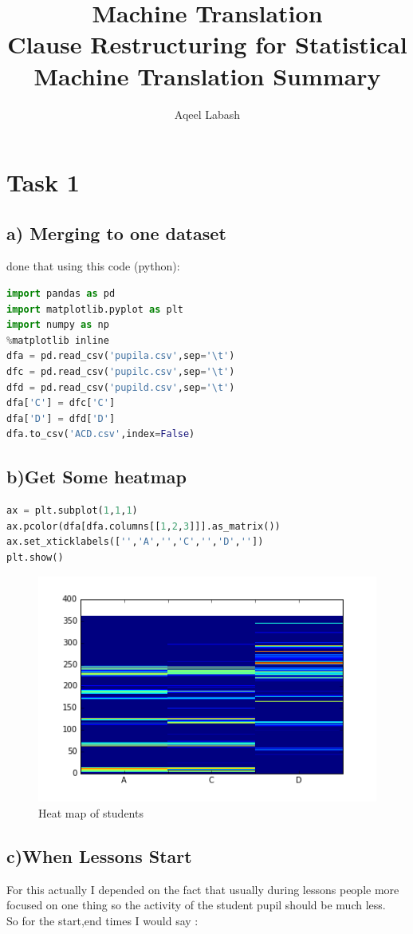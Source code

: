 \documentclass[10pt]{article}
\date{\vspace{-11.5ex}}
\author{\vspace{-10ex}}
\author{\large{Aqeel Labash}\vspace{4ex}}
\title{\vspace{-15ex}\huge{Machine Translation}\\\LARGE{Clause Restructuring for Statistical Machine Translation Summary}\vspace{-2ex}}
\begin{document}
\maketitle
\section*{Task 1}
\subsection*{a) Merging to one dataset}
done that using this code (python): 
\begin{lstlisting}[language=python]
import pandas as pd
import matplotlib.pyplot as plt
import numpy as np
%matplotlib inline
dfa = pd.read_csv('pupila.csv',sep='\t')
dfc = pd.read_csv('pupilc.csv',sep='\t')
dfd = pd.read_csv('pupild.csv',sep='\t')
dfa['C'] = dfc['C']
dfa['D'] = dfd['D']
dfa.to_csv('ACD.csv',index=False)
\end{lstlisting}
\subsection*{b)Get Some heatmap}
\begin{lstlisting}[language=python]
ax = plt.subplot(1,1,1)
ax.pcolor(dfa[dfa.columns[[1,2,3]]].as_matrix())
ax.set_xticklabels(['','A','','C','','D',''])
plt.show()
\end{lstlisting}
\begin{figure}[H]
\includegraphics[scale=1]{heatmap.png}
\caption{Heat map of students}
\end{figure}
\subsection*{c)When Lessons Start}
For this actually I depended on the fact that usually during lessons people more focused on one thing so the activity of the student pupil should be much less.\\
So for the start,end times I would say : \\
\end{document}
